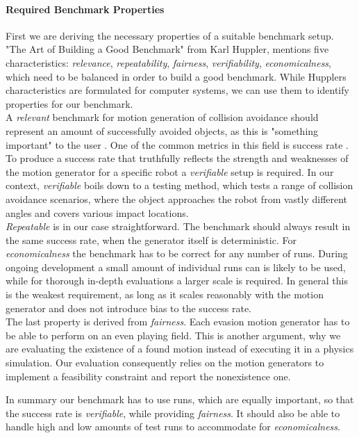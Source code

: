 \paragraph{Required Benchmark Properties} \label{par:benchmark:setup:properties}
First we are deriving the necessary properties of a suitable benchmark setup.
"The Art of Building a Good Benchmark" \cite{huppler_2009} from Karl Huppler, mentions five characteristics: \textit{relevance}, \textit{repeatability}, \textit{fairness}, \textit{verifiability}, \textit{economicalness}, which need to be balanced in order to build a good benchmark.
While Hupplers characteristics are formulated for computer systems, we can use them to identify properties for our benchmark.
\\
A \textit{relevant} benchmark for motion generation of collision avoidance should represent an amount of successfully avoided objects, as this is "something important" to the user \cite{huppler_2009}.
One of the common metrics in this field is success rate \cite{yang_2026,zhang_2026}.
\\
To produce a success rate that truthfully reflects the strength and weaknesses of the motion generator for a specific robot a \textit{verifiable} setup is required.
In our context, \textit{verifiable} boils down to a testing method, which tests a range of collision avoidance scenarios, where the object approaches the robot from vastly different angles and covers various impact locations.
\\
\textit{Repeatable} is in our case straightforward.
The benchmark should always result in the same success rate, when the generator itself is deterministic.
For \textit{economicalness} the benchmark has to be correct for any number of runs.
During ongoing development a small amount of individual runs can is likely to be used, while for thorough in-depth evaluations a larger scale is required.
In general this is the weakest requirement, as long as it scales reasonably with the motion generator and does not introduce bias to the success rate.
\\
The last property is derived from \textit{fairness}.
Each evasion motion generator has to be able to perform on an even playing field.
This is another argument, why we are evaluating the existence of a found motion instead of executing it in a physics simulation.
Our evaluation consequently relies on the motion generators to implement a feasibility constraint and report the nonexistence one.
\par
In summary our benchmark has to use runs, which are equally important, so that the success rate is \textit{verifiable}, while providing \textit{fairness}.
It should also be able to handle high and low amounts of test runs to accommodate for \textit{economicalness}.

